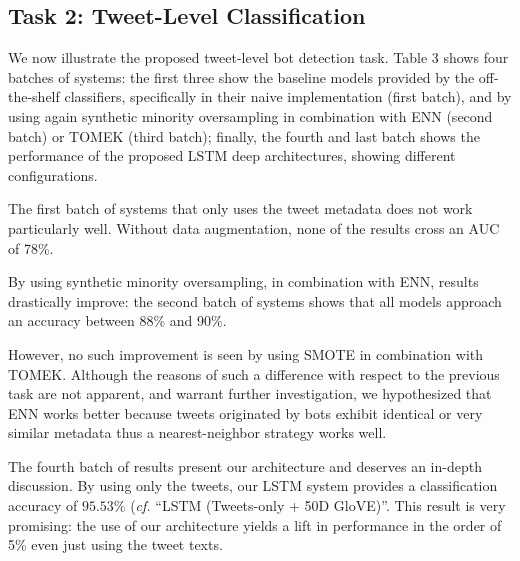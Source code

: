 










\subsection{Task 2: Tweet-Level Classification}

We now illustrate the proposed tweet-level bot detection task. 
Table 3 shows four batches of systems: the first three show the baseline models provided by the off-the-shelf classifiers, specifically in their naive implementation (first batch), and by using again synthetic minority oversampling in combination with ENN (second batch) or TOMEK (third batch); finally, the fourth and last batch shows the performance of the proposed LSTM deep architectures, showing different configurations.

The first batch of systems that only uses the tweet metadata does not work particularly well. Without data augmentation, none of the results cross an AUC of 78\%. 

By using synthetic minority oversampling, in combination with ENN, results drastically improve: the second batch of systems shows that all models approach an accuracy between 88\% and 90\%. 

However, no such improvement is seen by using SMOTE in combination with TOMEK. Although the reasons of such a difference with respect to the previous task are not apparent, and warrant further investigation, we hypothesized that ENN works better because tweets originated by bots exhibit identical or very similar metadata thus a nearest-neighbor strategy works well. \par 

The fourth batch of results present our architecture and deserves an in-depth discussion.
By using only the tweets, our LSTM system provides a classification accuracy of $95.53\%$ (\textit{cf.} ``LSTM (Tweets-only + 50D GloVE)''. This result is very promising: the use of our architecture yields a lift in performance in the order of 5\% even just using the tweet texts. 

